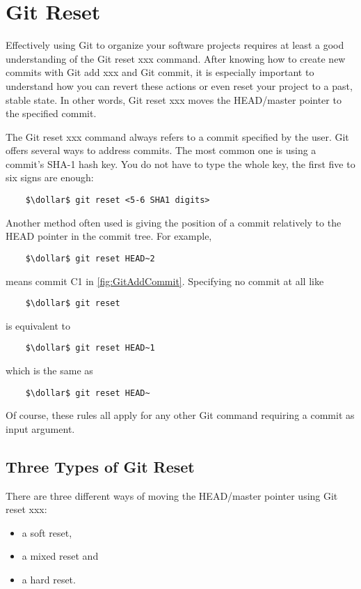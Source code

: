 \section{Git Reset}
\label{chapter:2.2}

Effectively using Git to organize your software projects requires at least a good understanding of the Git reset xxx 
command. After knowing how to create new commits with Git add xxx and Git commit, it is especially important to understand
how you can revert these actions or even reset your project to a past, stable state. In other words, Git reset xxx moves the
HEAD/master pointer to the specified commit.


The Git reset xxx command always refers to a commit specified by the user. Git offers several ways to address commits. The most
common one is using a commit's SHA-1 hash key. You do not have to type the whole key, the first five to six signs are enough:
\begin{lstlisting}
	$\dollar$ git reset <5-6 SHA1 digits> 
\end{lstlisting}
Another method often used is giving the position of a commit relatively to the HEAD pointer in the commit tree. For example, 
\begin{lstlisting}
	$\dollar$ git reset HEAD~2 
\end{lstlisting}
means commit C1 in \cref{fig:GitAddCommit}. Specifying no commit at all like
\begin{lstlisting}
	$\dollar$ git reset  
\end{lstlisting} 
is equivalent to 
\begin{lstlisting}
	$\dollar$ git reset HEAD~1 
\end{lstlisting}
which is the same as
\begin{lstlisting}
	$\dollar$ git reset HEAD~ 
\end{lstlisting}
Of course, these rules all apply for any other Git command requiring a commit as input argument. 


\subsection{Three Types of Git Reset}
\label{chapter:2.2.1}

There are three different ways of moving the HEAD/master pointer using Git reset xxx:
\begin{itemize}
	\item a soft reset,
	\item a mixed reset and
	\item a hard reset.
\end{itemize}


